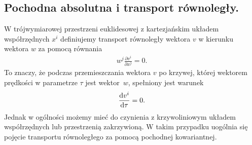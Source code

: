 \subsection{Pochodna absolutna i transport równoległy.}
W trójwymiarowej przestrzeni euklidesowej 
z kartezjańskim układem współrzędnych $x^i$
definiujemy transport równoległy wektora $v$ w kierunku wektora 
$w$ za pomocą równania 
\begin{align*}
w^j \frac{\partial v^i}{\partial x^j} = 0.
\end{align*}
To znaczy, że podczas przemieszczania wektora $v$ po krzywej, której
wektorem prędkości w parametrze $\tau$ jest wektor~$w$, spełniony jest 
warunek
\begin{align*}
 \frac{\text{d} v^i}{\text{d} \tau} = 0.
\end{align*}
Jednak w ogólności możemy mieć do czynienia z krzywoliniowym układem 
współrzędnych lub przestrzenią zakrzywioną. W takim przypadku uogólnia
się pojęcie transportu równoległego za pomocą pochodnej kowariantnej.
